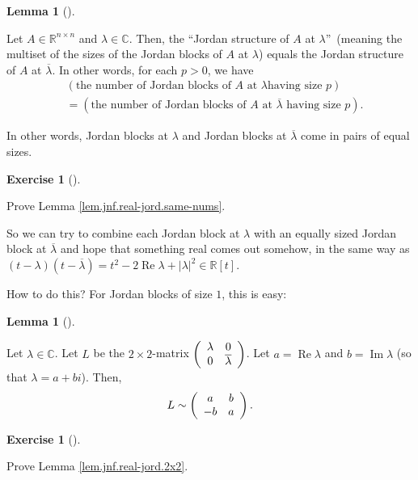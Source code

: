 \documentclass[numbers=enddot,12pt,final,onecolumn,notitlepage]{scrartcl}%
\newcounter{exer}
\numberwithin{exer}{subsection}
\theoremstyle{definition}
\newtheorem{lem}[theo]{Lemma}
\newenvironment{lemma}[1][]
{\begin{lem}[#1]\begin{leftbar}}
{\end{leftbar}\end{lem}}
\newtheorem{exmp}[exer]{Exercise}
\newenvironment{exercise}[1][]
{\begin{exmp}[#1]\begin{leftbar}}
{\end{leftbar}\end{exmp}}
\begin{document}
\begin{lemma}
\label{lem.jnf.real-jord.same-nums}Let $A\in\mathbb{R}^{n\times n}$ and
$\lambda\in\mathbb{C}$. Then, the \textquotedblleft Jordan structure of $A$ at
$\lambda$\textquotedblright\ (meaning the multiset of the sizes of the Jordan
blocks of $A$ at $\lambda$) equals the Jordan structure of $A$ at
$\overline{\lambda}$. In other words, for each $p>0$, we have%
\begin{align*}
&  \left(  \text{the number of Jordan blocks of }A\text{ at }\lambda\text{
having size }p\right) \\
&  =\left(  \text{the number of Jordan blocks of }A\text{ at }\overline
{\lambda}\text{ having size }p\right)  .
\end{align*}


In other words, Jordan blocks at $\lambda$ and Jordan blocks at $\overline
{\lambda}$ come in pairs of equal sizes.
\end{lemma}

\begin{exercise}
 Prove Lemma \ref{lem.jnf.real-jord.same-nums}.
\end{exercise}

So we can try to combine each Jordan block at $\lambda$ with an equally sized
Jordan block at $\overline{\lambda}$ and hope that something real comes out
somehow, in the same way as $\left(  t-\lambda\right)  \left(  t-\overline
{\lambda}\right)  =t^{2}-2\operatorname*{Re}\lambda+\left\vert \lambda
\right\vert ^{2}\in\mathbb{R}\left[  t\right]  $.

How to do this? For Jordan blocks of size $1$, this is easy:

\begin{lemma}
\label{lem.jnf.real-jord.2x2}Let $\lambda\in\mathbb{C}$. Let $L$ be the
$2\times2$-matrix $\left(
\begin{array}
[c]{cc}%
\lambda & 0\\
0 & \overline{\lambda}%
\end{array}
\right)  $. Let $a=\operatorname*{Re}\lambda$ and $b=\operatorname*{Im}%
\lambda$ (so that $\lambda=a+bi$). Then,%
\[
L\sim\left(
\begin{array}
[c]{cc}%
a & b\\
-b & a
\end{array}
\right)  .
\]

\end{lemma}

\begin{exercise}
 Prove Lemma \ref{lem.jnf.real-jord.2x2}.
\end{exercise}
\end{document}
